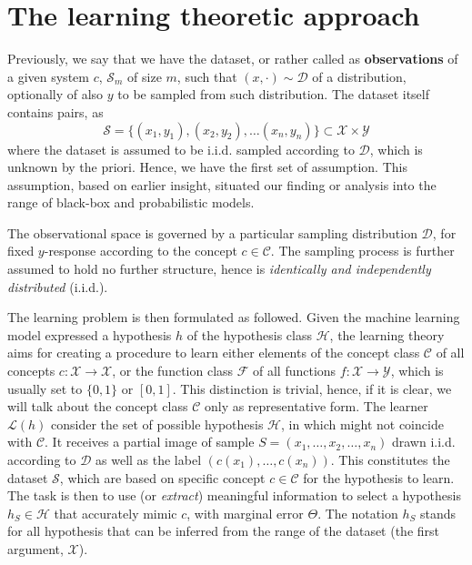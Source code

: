 \section{The learning theoretic approach}

Previously, we say that we have the dataset, or rather called as \textbf{observations} of a given system $c$, $\mathcal{S}_{m}$ of size $m$, such that $(x,\cdot)\sim \mathcal{D}$ of a distribution, optionally of also $y$ to be sampled from such distribution. The dataset itself contains pairs, as
\begin{equation*}
    \mathcal{S} = \{ (x_1,y_1), (x_2, y_2),\dots(x_n,y_n) \} \subset \mathcal{X}\times \mathcal{Y}
\end{equation*}
where the dataset is assumed to be i.i.d. sampled according to $\mathcal{D}$, which is unknown by the priori. Hence, we have the first set of assumption. This assumption, based on earlier insight, situated our finding or analysis into the range of black-box and probabilistic models. 
\begin{assumption}
The observational space is governed by a particular sampling distribution $\mathcal{D}$, for fixed $y$-response according to the concept $c\in \mathcal{C}$. The sampling process is further assumed to hold no further structure, hence is \textit{identically and independently distributed} (i.i.d.). 
\end{assumption}

The learning problem is then formulated as followed. Given the machine learning model expressed a hypothesis $h$ of the hypothesis class $\mathcal{H}$, the learning theory aims for creating a procedure to learn either elements of the concept class $\mathcal{C}$ of all concepts $c: \mathcal{X}\to \mathcal{X}$, or the function class $\mathcal{F}$ of all functions $f: \mathcal{X}\to \mathcal{Y}$, which is usually set to $\{0,1\}$ or $[0,1]$. This distinction is trivial, hence, if it is clear, we will talk about the concept class $\mathcal{C}$ only as representative form. The learner $\mathcal{L}(h)$ consider the set of possible hypothesis $\mathcal{H}$, in which might not coincide with $\mathcal{C}$. It receives a partial image of sample $S=(x_{1},\dots,x_{2},\dots,x_n)$ drawn i.i.d. according to $\mathcal{D}$ as well as the label $(c(x_1),\dots,c(x_n))$. This constitutes the dataset $\mathcal{S}$, which are based on specific concept $c\in \mathcal{C}$ for the hypothesis to learn. The task is then to use (or \textit{extract}) meaningful information to select a hypothesis $h_{S}\in \mathcal{H}$ that accurately mimic $c$, with marginal error $\Theta$. The notation $h_{S}$ stands for all hypothesis that can be inferred from the range of the dataset (the first argument, $\mathcal{X}$). 

